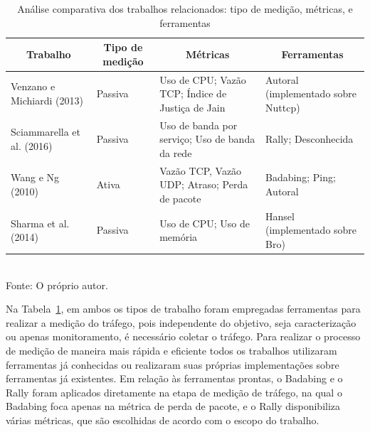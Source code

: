\begin{table}[!htb]
\centering
\scriptsize
\caption{Análise comparativa dos trabalhos relacionados: tipo de medição, métricas, e ferramentas}
\begin{tabularx}{\textwidth}{XXXX}
\hline
\multicolumn{1}{c|}{\textbf{Trabalho}} & \multicolumn{1}{c|}{\textbf{Tipo de medição}} & \multicolumn{1}{c|}{\textbf{Métricas}}           & \multicolumn{1}{c}{\textbf{Ferramentas}} \\ \hline
Venzano e Michiardi (2013)             & \multicolumn{1}{l}{Passiva}                              & Uso de CPU; Vazão TCP; Índice de Justiça de Jain & Autoral (implementado sobre Nuttcp)      \\
\rowcolor[HTML]{EFEFEF} 
Sciammarella et al. (2016)             & \multicolumn{1}{l}{Passiva}                                                  & Uso de banda por serviço; Uso de banda da rede   & Rally; Desconhecida                      \\
Wang e Ng (2010)                       & \multicolumn{1}{l}{Ativa}                                                    & Vazão TCP, Vazão UDP; Atraso; Perda de pacote    & Badabing; Ping; Autoral                  \\
\rowcolor[HTML]{EFEFEF} 
Sharma et al. (2014)                   & \multicolumn{1}{l}{Passiva}                                                  & Uso de CPU; Uso de memória                       & Hansel (implementado sobre Bro)          \\ \hline
\end{tabularx}
\label{tab:trab_relacionados_metrica}\\
Fonte: O próprio autor.
\end{table}

Na Tabela~\ref{tab:trab_relacionados_metrica}, em ambos os tipos de trabalho foram empregadas ferramentas para realizar a medição do tráfego, pois independente do objetivo, seja caracterização ou apenas monitoramento, é necessário coletar o tráfego.
%
Para realizar o processo de medição de maneira mais rápida e eficiente todos os trabalhos utilizaram ferramentas já conhecidas ou realizaram suas próprias implementações sobre ferramentas já existentes.
%
Em relação às ferramentas prontas, o Badabing e o Rally foram aplicados diretamente na etapa de medição de tráfego, na qual o Badabing foca apenas na métrica de perda de pacote, e o Rally disponibiliza várias métricas, que são escolhidas de acordo com o escopo do trabalho.

